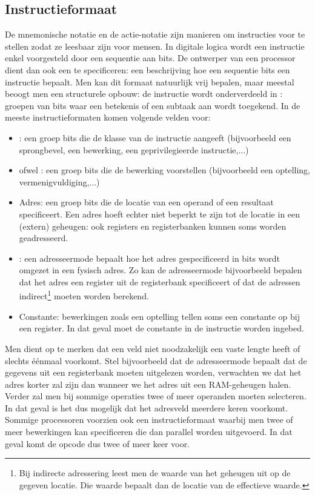 \subsection{Instructieformaat}
De mnemonische notatie en de actie-notatie zijn manieren om instructies voor te stellen zodat ze leesbaar zijn voor mensen. In digitale logica wordt een instructie enkel voorgesteld door een sequentie aan bits. De ontwerper van een processor dient dan ook een  te specificeren: een beschrijving hoe een sequentie bits een instructie bepaalt. Men kan dit formaat natuurlijk vrij bepalen, maar meestal beoogt men een structurele opbouw: de instructie wordt onderverdeeld in : groepen van bits waar een betekenis of een subtaak aan wordt toegekend. In de meeste instructieformaten komen volgende velden voor:
\begin{itemize}
 \item {}: een groep bits die de klasse van de instructie aangeeft (bijvoorbeeld een sprongbevel, een bewerking, een geprivilegieerde instructie,...)
 \item {} ofwel : een groep bits die de bewerking voorstellen (bijvoorbeeld een optelling, vermenigvuldiging,...)
 \item Adres: een groep bits die de locatie van een operand of een resultaat specificeert. Een adres hoeft echter niet beperkt te zijn tot de locatie in een (extern) geheugen: ook registers en registerbanken kunnen soms worden geadresseerd.
 \item {}: een adresseermode bepaalt hoe het adres gespecificeerd in bits wordt omgezet in een fysisch adres. Zo kan de adresseermode bijvoorbeeld bepalen dat het adres een register uit de registerbank specificeert of dat de adressen indirect\footnote{Bij indirecte adressering leest men de waarde van het geheugen uit op de gegeven locatie. Die waarde bepaalt dan de locatie van de effectieve waarde.} moeten worden berekend.
 \item Constante: bewerkingen zoals een optelling tellen soms een constante op bij een register. In dat geval moet de constante in de instructie worden ingebed.
\end{itemize}
Men dient op te merken dat een veld niet noodzakelijk een vaste lengte heeft of slechts \'e\'enmaal voorkomt. Stel bijvoorbeeld dat de adresseermode bepaalt dat de gegevens uit een registerbank moeten uitgelezen worden, verwachten we dat het adres korter zal zijn dan wanneer we het adres uit een RAM-geheugen halen. Verder zal men bij sommige operaties twee of meer operanden moeten selecteren. In dat geval is het dus mogelijk dat het adresveld meerdere keren voorkomt. Sommige processoren voorzien ook een instructieformaat waarbij men twee of meer bewerkingen kan specificeren die dan parallel worden uitgevoerd. In dat geval komt de opcode dus twee of meer keer voor.

